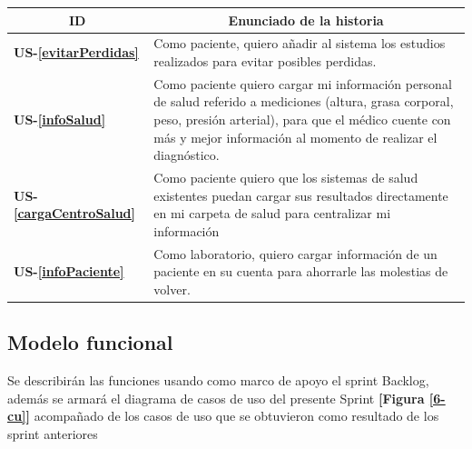 \begin{table}[h]

    \centering
	\begin{tabular}{|l|p{9cm}|}
	\hline
        \multicolumn{1}{|c|}{\textbf{ID}} &
        \multicolumn{1}{c|}{\textbf{Enunciado de la historia}} \\          
    \hline
        \textbf{US-\ref{evitarPerdidas} } & Como paciente, quiero añadir al sistema los estudios realizados para evitar posibles perdidas.\\
    \hline
    	\textbf{US-\ref{infoSalud}} & Como paciente quiero cargar mi información personal de salud referido a mediciones (altura, grasa corporal, peso, presión arterial), para que el médico cuente con más y mejor información al momento de realizar el diagnóstico.\\
    \hline
    \textbf{US- \ref{cargaCentroSalud}} & Como paciente quiero que los sistemas de salud existentes puedan cargar sus resultados directamente en mi carpeta de salud para centralizar mi
    información\\
    \hline
    \textbf{US-\ref{infoPaciente}} &Como laboratorio, quiero cargar información de un paciente en su cuenta para ahorrarle las molestias de volver.\\
    \hline
    \end{tabular}
    \label{USrelacionados-Sprint6}
\end{table}

\subsection{Modelo funcional} %
Se describirán las funciones usando como marco de apoyo el sprint Backlog, además se armará el diagrama de casos de uso del presente Sprint \textbf{[Figura \ref{6-cu}]} acompañado de los casos de uso que se obtuvieron como resultado de los sprint anteriores



